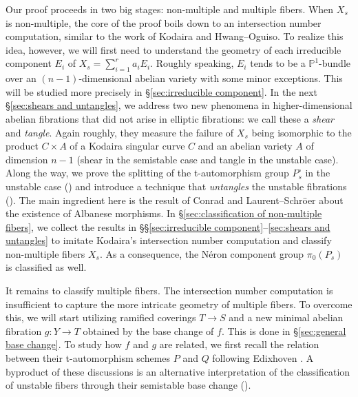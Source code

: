 \documentclass[reqno, letterpaper]{amsart}
\numberwithin{equation}{subsection}
\let\to\longrightarrow
\newcommand{\PP}{\mathbb{P}}
\begin{document}
		\medskip
		
		Our proof proceeds in two big stages: non-multiple and multiple fibers. When $X_s$ is non-multiple, the core of the proof boils down to an intersection number computation, similar to the work of Kodaira and Hwang--Oguiso. To realize this idea, however, we will first need to understand the geometry of each irreducible component $E_i$ of $X_s = \sum_{i=1}^r a_i E_i$. Roughly speaking, $E_i$ tends to be a $\PP^1$-bundle over an $(n-1)$-dimensional abelian variety with some minor exceptions. This will be studied more precisely in \S \ref{sec:irreducible component}. In the next \S \ref{sec:shears and untangles}, we address two new phenomena in higher-dimensional abelian fibrations that did not arise in elliptic fibrations: we call these a \emph{shear} and \emph{tangle}. Again roughly, they measure the failure of $X_s$ being isomorphic to the product $C \times A$ of a Kodaira singular curve $C$ and an abelian variety $A$ of dimension $n-1$ (shear in the semistable case and tangle in the unstable case). Along the way, we prove the splitting of the t-automorphism group $P_s^\circ$ in the unstable case () and introduce a technique that \emph{untangles} the unstable fibrations (). The main ingredient here is the result of Conrad and Laurent--Schr\"oer \cite{con:albanese, lau-sch24} about the existence of Albanese morphisms. In \S \ref{sec:classification of non-multiple fibers}, we collect the results in \S \S \ref{sec:irreducible component}--\ref{sec:shears and untangles} to imitate Kodaira's intersection number computation and classify non-multiple fibers $X_s$. As a consequence, the N\'eron component group $\pi_0(P_s)$ is classified as well.
		
		\medskip
		
		It remains to classify multiple fibers. The intersection number computation is insufficient to capture the more intricate geometry of multiple fibers. To overcome this, we will start utilizing ramified coverings $T \to S$ and a new minimal abelian fibration $g : Y \to T$ obtained by the base change of $f$. This is done in \S \ref{sec:general base change}. To study how $f$ and $g$ are related, we first recall the relation between their t-automorphism schemes $P$ and $Q$ following Edixhoven \cite{edi92}. A byproduct of these discussions is an alternative interpretation of the classification of unstable fibers through their semistable base change ().
		
\end{document}

